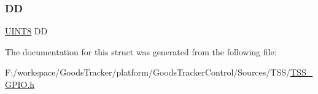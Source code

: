 \subsubsection{\texorpdfstring{DD}{DD}}
{\footnotesize\ttfamily \hyperlink{_t_s_s___data_types_8h_ab27e9918b538ce9d8ca692479b375b6a}{U\+I\+N\+T8} DD}



The documentation for this struct was generated from the following file\+:\begin{DoxyCompactItemize}
\item 
F\+:/workspace/\+Goods\+Tracker/platform/\+Goods\+Tracker\+Control/\+Sources/\+T\+S\+S/\hyperlink{_t_s_s___g_p_i_o_8h}{T\+S\+S\+\_\+\+G\+P\+I\+O.\+h}\end{DoxyCompactItemize}
